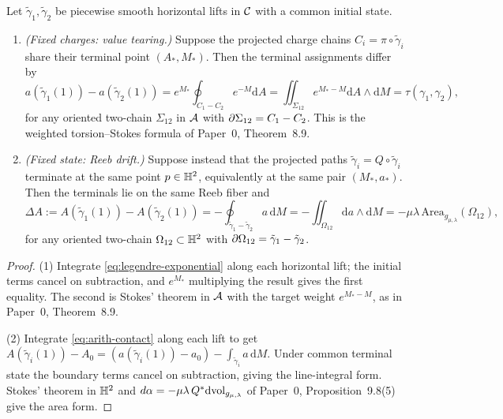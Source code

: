 \begin{theorem}
\label{thm:dual-tearing}
Let $\tilde\gamma_1,\tilde\gamma_2$ be piecewise smooth horizontal lifts in
$\mathcal{C}$ with a common initial state.
\begin{enumerate}[label=(\arabic*)]
  \item \emph{(Fixed charges: value tearing.)}  Suppose the projected charge
  chains $C_i=\pi\circ\tilde\gamma_i$ share their terminal point $(A_*,M_*)$.
  Then the terminal assignments differ by
  \begin{equation}\label{eq:value-tearing}
    a(\tilde\gamma_1(1))-a(\tilde\gamma_2(1))
    =e^{M_*}\oint_{C_1-C_2}e^{-M}\mathrm dA
    =\iint_{\Sigma_{12}}e^{M_*-M}\mathrm dA\wedge\mathrm dM
    =\tau(\gamma_1,\gamma_2),
  \end{equation}
  for any oriented two-chain $\Sigma_{12}$ in $\mathcal{A}$ with
  $\partial\Sigma_{12}=C_1-C_2$.  This is the weighted torsion--Stokes formula of
  Paper~0, Theorem~8.9.
  \item \emph{(Fixed state: Reeb drift.)}  Suppose instead that the projected
  paths $\tilde\gamma_i=Q\circ\tilde\gamma_i$ terminate at the same point
  $p\in\mathbb{H}^2$, equivalently at the same pair $(M_*,a_*)$.  Then the terminals
  lie on the same Reeb fiber and
  \begin{equation}\label{eq:reeb-drift}
    \Delta A:=A(\tilde\gamma_1(1))-A(\tilde\gamma_2(1))
    =-\oint_{\tilde\gamma_1-\tilde\gamma_2}a\,\mathrm dM
    =-\iint_{\Omega_{12}}\mathrm da\wedge\mathrm dM
    =-\mu\lambda\,\mathrm{Area}_{g_{\mu,\lambda}}(\Omega_{12}),
  \end{equation}
  for any oriented two-chain $\Omega_{12}\subset\mathbb{H}^2$ with
  $\partial\Omega_{12}=\tilde\gamma_1-\tilde\gamma_2$.
\end{enumerate}
\end{theorem}

\begin{proof}
(1) Integrate \eqref{eq:legendre-exponential} along each horizontal lift; the
initial terms cancel on subtraction, and $e^{M_*}$ multiplying the result gives
the first equality.  The second is Stokes' theorem in $\mathcal{A}$ with the target
weight $e^{M_*-M}$, as in Paper~0, Theorem~8.9.

(2) Integrate \eqref{eq:arith-contact} along each lift to get
$A(\tilde\gamma_i(1))-A_0=(a(\tilde\gamma_i(1))-a_0)-\int_{\tilde\gamma_i}
a\,\mathrm dM$.  Under common terminal state the boundary terms cancel on
subtraction, giving the line-integral form.  Stokes' theorem in $\mathbb{H}^2$ and
$d\alpha=-\mu\lambda\,Q^*\mathrm d\mathrm{vol}_{g_{\mu,\lambda}}$ of Paper~0,
Proposition~9.8(5) give the area form.
\end{proof}

